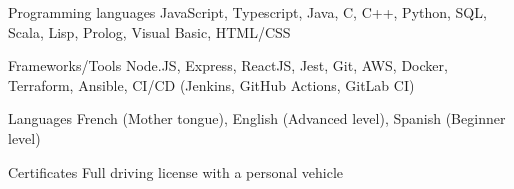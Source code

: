 
\begin{cvskills}
  \cvskill
    {Programming languages} %
    {JavaScript, Typescript, Java, C, C++, Python, SQL, Scala, Lisp, Prolog, Visual Basic, HTML/CSS} %

  \cvskill
    {Frameworks/Tools} %
    {Node.JS, Express, ReactJS, Jest, Git, AWS, Docker, Terraform, Ansible, CI/CD (Jenkins, GitHub Actions, GitLab CI)} %
    
  \cvskill
    {Languages} %
    {French (Mother tongue), English (Advanced level), Spanish (Beginner level)} %
    
  \cvskill
    {Certificates} %
    {Full driving license with a personal vehicle} %
\end{cvskills}
